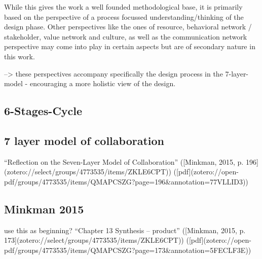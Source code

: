 While this gives the work a well founded methodological base, it is primarily based on the perspective of a process focussed understanding/thinking of the design phase. Other perspectives like the ones of resource, behavioral network / stakeholder, value network and culture, as well as the communication network perspective may come into play in certain aspects but are of secondary nature in this work.

--> these perspectives accompany specifically the design process in the 7-layer-model - encouraging a more holistic view of the design.

\subsection{6-Stages-Cycle}




\subsection{7 layer model of collaboration}

“Reflection on the Seven-Layer Model of Collaboration” ([Minkman, 2015, p. 196](zotero://select/groups/4773535/items/ZKLE6CPT)) ([pdf](zotero://open-pdf/groups/4773535/items/QMAPCSZG?page=196&annotation=77VLLID3))






\subsection{Minkman 2015}
use this as beginning?
“Chapter 13 Synthesis – product” ([Minkman, 2015, p. 173](zotero://select/groups/4773535/items/ZKLE6CPT)) ([pdf](zotero://open-pdf/groups/4773535/items/QMAPCSZG?page=173&annotation=5FECLF3E))

